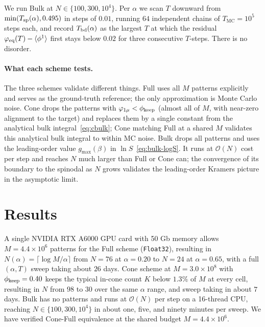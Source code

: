 \documentclass[letterpaper]{article} %
\newcommand{\avg}[1]{\langle #1 \rangle}
\newcommand{\Bnet}{\beta}
\newcommand{\gmax}{g_{\max}}
\begin{document}
We run Bulk at $N \in \{100, 300, 10^4\}$.  Per $\alpha$ we scan $T$
downward from $\min(T_{\rm sp}(\alpha), 0.495)$ in steps of $0.01$,
running $64$ independent chains of $T_{\mathrm{MC}} = 10^5$ steps each,
and record $T_{\rm bd}(\alpha)$ as the largest $T$ at which the
residual $\varphi_{\rm eq}(T) - \avg{\phi^1}$ first stays below $0.02$
for three consecutive $T$-steps.  There is no disorder.

\paragraph{What each scheme tests.}
The three schemes validate different things.  Full uses all $M$
patterns explicitly and serves as the ground-truth reference; the
only approximation is Monte Carlo noise.  Cone drops the patterns
with $\varphi_{1\mu} < \phi_{\rm keep}$ (almost all of $M$, with
near-zero alignment to the target) and replaces them by a single
constant from the analytical bulk integral~\eqref{eq:cbulk}; Cone
matching Full at a shared $M$ validates this analytical bulk
integral to within MC noise.  Bulk drops all patterns and uses the
leading-order value $\gmax(\Bnet)$ in $\ln S$~\eqref{eq:bulk-logS}.
It runs at $\mathcal{O}(N)$ cost per step and reaches $N$ much
larger than Full or Cone can; the convergence of its boundary to the
spinodal as $N$ grows validates the leading-order Kramers picture in
the asymptotic limit.



\section{Results}
\label{sec:results}

A single NVIDIA RTX A6000 GPU card with 50 Gb memory allows 
$M = 4.4 \times 10^6$ patterns for the Full scheme (\texttt{Float32}), resulting in
$N(\alpha) = \lceil \log M / \alpha \rceil$ from $N = 76$ at
$\alpha = 0.20$ to $N = 24$ at $\alpha = 0.65$, with a full
$(\alpha, T)$ sweep taking about $26$ days.  Cone scheme at
$M = 3.0 \times 10^8$ with $\phi_{\rm keep} = 0.40$ keeps the typical
in-cone count $K$ below $1.3\%$ of $M$ at every cell, resulting in $N$ from
$98$ to $30$ over the same $\alpha$ range, and sweep taking in about $7$ days.  Bulk
has no patterns and runs at $\mathcal{O}(N)$ per step on a 16-thread
CPU, reaching $N \in \{100, 300, 10^4\}$ in about one, five, and
ninety minutes per sweep.  We have verified Cone-Full equivalence at
the shared budget $M = 4.4 \times 10^6$.
\end{document}
